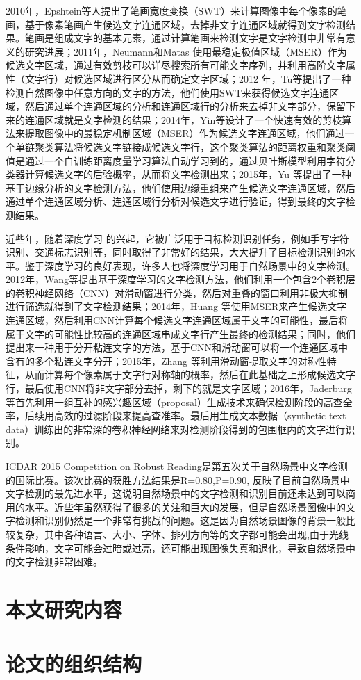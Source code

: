     2010年，Epshtein\cite{Epshtein2010Detecting}等人提出了笔画宽度变换（SWT）来计算图像中每个像素的笔画，基于像素笔画产生候选文字连通区域，去掉非文字连通区域就得到文字检测结果。笔画是组成文字的基本元素，通过计算笔画来检测文字是文字检测中非常有意义的研究进展；2011年，Neumann和Matas\cite{Neumann2011Text} 使用最稳定极值区域（MSER）作为候选文字区域，通过有效剪枝可以详尽搜索所有可能文字序列，并利用高阶文字属性（文字行）对候选区域进行区分从而确定文字区域；2012 年，Tu\cite{Tu2012Detecting}等提出了一种检测自然图像中任意方向的文字的方法，他们使用SWT来获得候选文字连通区域，然后通过单个连通区域的分析和连通区域行的分析来去掉非文字部分，保留下来的连通区域就是文字检测的结果；2014年，Yin\cite{Yin2013Robust}等设计了一个快速有效的剪枝算法来提取图像中的最稳定机制区域（MSER）作为候选文字连通区域，他们通过一个单链聚类算法将候选文字链接成候选文字行，这个聚类算法的距离权重和聚类阈值是通过一个自训练距离度量学习算法自动学习到的，通过贝叶斯模型利用字符分类器计算候选文字的后验概率，从而将文字检测出来；2015年，Yu\cite{Yu2015Text} 等提出了一种基于边缘分析的文字检测方法，他们使用边缘重组来产生候选文字连通区域，然后通过单个连通区域分析、连通区域行分析对候选文字进行验证，得到最终的文字检测结果。

    近些年，随着深度学习\cite{Moral2010Foundations} 的兴起，它被广泛用于目标检测识别任务，例如手写字符识别、交通标志识别等，同时取得了非常好的结果，大大提升了目标检测识别的水平。鉴于深度学习的良好表现，许多人也将深度学习用于自然场景中的文字检测。2012年，Wang\cite{Wang2012End}等提出基于深度学习的文字检测方法，他们利用一个包含2个卷积层的卷积神经网络（CNN）对滑动窗进行分类，然后对重叠的窗口利用非极大抑制进行筛选就得到了文字检测结果；2014年，Huang\cite{Huang2014Robust} 等使用MSER来产生候选文字连通区域，然后利用CNN计算每个候选文字连通区域属于文字的可能性，最后将属于文字的可能性比较高的连通区域串成文字行产生最终的检测结果；同时，他们提出来一种用于分开粘连文字的方法，基于CNN和滑动窗可以将一个连通区域中含有的多个粘连文字分开；2015年，Zhang\cite{Zhang2015Symmetry} 等利用滑动窗提取文字的对称性特征，从而计算每个像素属于文字行对称轴的概率，然后在此基础之上形成候选文字行，最后使用CNN将非文字部分去掉，剩下的就是文字区域；2016年，Jaderburg\cite{Jaderberg2016Reading}等首先利用一组互补的感兴趣区域（proposal）生成技术来确保检测阶段的高查全率，后续用高效的过滤阶段来提高查准率。最后用生成文本数据（synthetic text data）训练出的非常深的卷积神经网络来对检测阶段得到的包围框内的文字进行识别。
    
    ICDAR 2015 Competition on Robust Reading是第五次关于自然场景中文字检测的国际比赛。该次比赛的获胜方法结果是R=0.80,P=0.90, 反映了目前自然场景中文字检测的最先进水平，这说明自然场景中的文字检测和识别目前还未达到可以商用的水平。近些年虽然获得了很多的关注和巨大的发展，但是自然场景图像中的文字检测和识别仍然是一个非常有挑战的问题。这是因为自然场景图像的背景一般比较复杂，其中各种语言、大小、字体、排列方向等的文字都可能会出现,由于光线条件影响，文字可能会过暗或过亮，还可能出现图像失真和退化，导致自然场景中的文字检测非常困难。

    \section{本文研究内容}

    \section{论文的组织结构}



